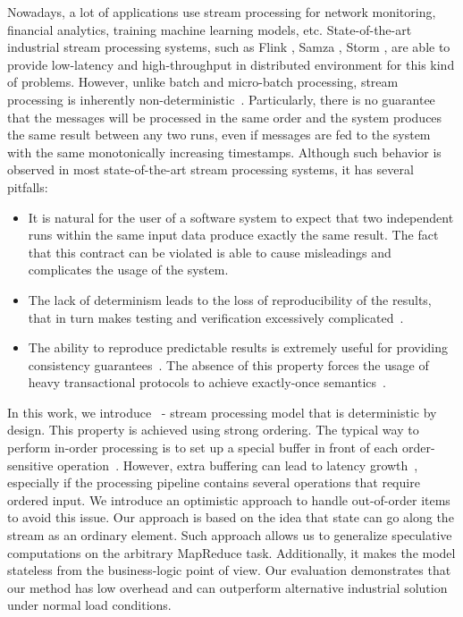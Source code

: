 
\label {fs-intro-seciton}

Nowadays, a lot of  
applications use stream processing for network monitoring, financial analytics, training machine learning models, etc. 
State-of-the-art industrial stream processing systems, such as Flink \cite{carbone2015apache}, Samza \cite{Noghabi:2017:SSS:3137765.3137770}, Storm \cite{apache:storm}, are able to provide low-latency and high-throughput in distributed environment for this kind of problems. 
However, unlike batch and micro-batch processing, stream processing is inherently non-deterministic~\cite{Zaharia:2012:DSE:2342763.2342773}. 
Particularly, there is no guarantee that the messages will be processed in the same order and the system produces the same result between any two runs, even if messages are fed to the system with the same monotonically increasing timestamps. 
Although such behavior is observed in most state-of-the-art stream processing systems, it has several 
pitfalls:

\begin{itemize}
 \item 
It is natural for the user of a software system to expect  that two independent runs within the same input data produce exactly the same result. The fact that this contract can be violated is able to cause misleadings and complicates the usage of the system.

    \item 
    The lack of determinism leads to the loss of reproducibility of the results, that in turn makes
    testing and verification excessively complicated~\cite{Zacheilas:2017:MDS:3093742.3093921}.
    \item 
    The ability to reproduce predictable results is extremely useful for providing consistency guarantees~\cite{Stonebraker:2005:RRS:1107499.1107504}. 
    The absence of this property forces the usage of heavy transactional protocols to achieve exactly-once semantics~\cite{Carbone:2017:SMA:3137765.3137777, jacques2016consistent}.
\end{itemize}

In this work, we introduce \FlameStream\ - stream processing model that is deterministic by design. This property is achieved using strong ordering. 
The typical way to perform in-order processing is to set up a special buffer in front of each order-sensitive operation~\cite{Li:2008:OPN:1453856.1453890}. 
However, extra buffering can lead to latency growth~\cite{Zacheilas:2017:MDS:3093742.3093921}, especially if the processing pipeline contains several operations that require ordered input. We introduce an optimistic approach to handle out-of-order items to avoid this issue. 
Our approach is based on the idea that state can go along the stream as an ordinary element. 
Such approach allows us to generalize speculative computations on the arbitrary MapReduce task. 
Additionally, it makes the model stateless from the business-logic point of view. Our evaluation demonstrates that our method has low overhead and can outperform alternative industrial solution under normal load conditions.

